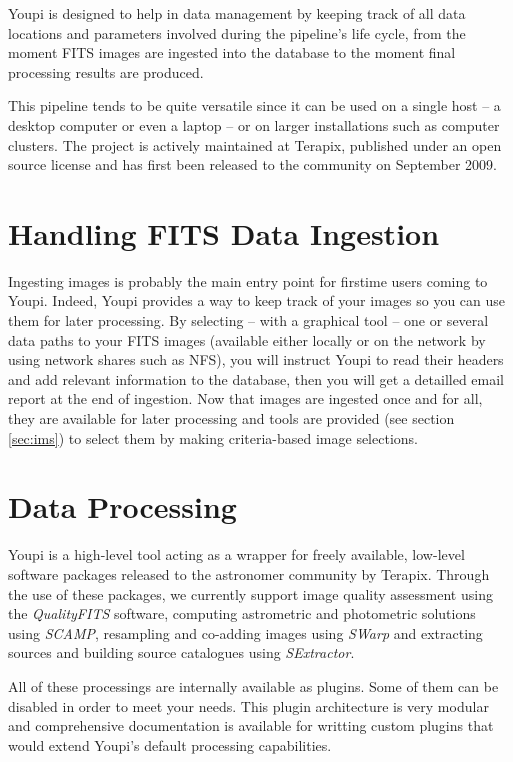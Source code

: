 \documentclass[11pt,twoside]{article}  %
\begin{document}
Youpi is designed to help in data management by keeping track of all data locations 
and parameters involved during the pipeline's life cycle, from the moment FITS images 
are ingested into the database to the moment final processing results are produced.

This pipeline tends to be quite versatile since it can be used on a single host -- a 
desktop computer or even a laptop -- or on larger installations such as computer 
clusters. The project is actively maintained at Terapix, published under an open 
source license and has first been released to the community on September 2009.

\section{Handling FITS Data Ingestion}

Ingesting images is probably the main entry point for firstime users coming to Youpi.
Indeed, Youpi provides a way to keep track of your images so you can use them for later 
processing. By selecting -- with a graphical tool --
one or several data paths to your FITS images (available either locally or on the 
network by using network shares such as NFS), you will instruct Youpi to read their 
headers and add relevant information to the database, then you will get a detailled 
email report at the end of ingestion. Now that images are ingested once and for all, 
they are available for later processing and tools are provided (see section \ref{sec:ims}) 
to select them by making criteria-based image selections.

\section{Data Processing}

Youpi is a high-level tool acting as a wrapper for freely available, low-level software 
packages released to the astronomer community by Terapix. Through the use of these packages, 
we currently support image quality assessment using the \emph{QualityFITS} software, 
computing astrometric and photometric solutions using \emph{SCAMP}, resampling and co-adding 
images using \emph{SWarp} and extracting sources and building source catalogues using 
\emph{SExtractor}.

All of these processings are internally available as plugins. Some of them can be disabled 
in order to meet your needs. This plugin architecture is very modular and comprehensive 
documentation is available for writting custom plugins that would extend Youpi's default 
processing capabilities.
\end{document}

